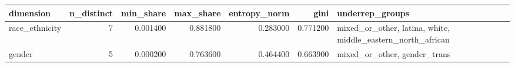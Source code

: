 \begin{tabular}{lrrrrrl}
\toprule
dimension & n_distinct & min_share & max_share & entropy_norm & gini & underrep_groups \\
\midrule
race_ethnicity & 7 & 0.001400 & 0.881800 & 0.283000 & 0.771200 & mixed_or_other, latina, white, middle_eastern_north_african \\
gender & 5 & 0.000200 & 0.763600 & 0.464400 & 0.663900 & mixed_or_other, gender_trans \\
\bottomrule
\end{tabular}
